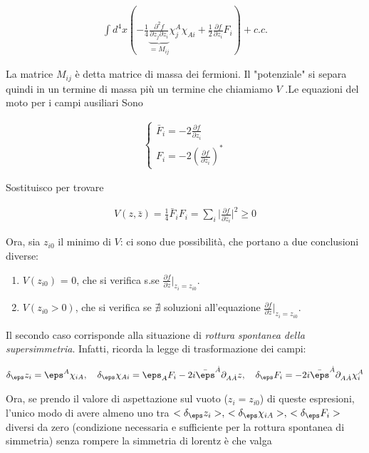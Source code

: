 \documentclass{report}
\begin{document}
\begin{align}
    \int d^4x \left(-\frac{1}{4}\underbrace{\frac{\partial^2 f}{\partial z_j \partial z_i}}_{= M_{ij}}\chi^A_j \chi_{Ai} + \frac{1}{2}\frac{\partial f}{\partial z_i}F_i \right) + c.c.
\end{align}

La matrice \(M_{ij}\) è detta matrice di massa dei fermioni. Il "potenziale" si separa quindi in un termine di massa più un termine che chiamiamo \(V\) .Le equazioni del moto per i campi ausiliari Sono

\begin{align}
    \begin{cases}
        \bar{F}_i = -2\frac{\partial f}{\partial z_i} \\ F_i = -2\left(\frac{\partial f}{\partial z_i}\right)^*
    \end{cases}
\end{align}

Sostituisco per trovare 

\begin{align}
    V(z, \bar{z}) = \frac{1}{4}\bar{F}_i F_i = \sum_i \biggr|\frac{\partial f}{\partial z_i} \biggr|^2 \geq 0 
\end{align}

Ora, sia \(z_{i0}\) il minimo di \(V\): ci sono due possibilità, che portano a due conclusioni diverse: 

\begin{enumerate}
    \item \(V(z_{i0})\) = 0, che si verifica s.se \(\frac{\partial f}{\partial z}\biggr|_{z_i = z_{i0}}\). 
    \item \(V(z_{i0} > 0)\), che si verifica se \(\nexists\) soluzioni all'equazione \(\frac{\partial f}{\partial z}\biggr|_{z_i = z_{i0}}\). 
\end{enumerate}

Il secondo caso corrisponde alla situazione di \emph{rottura spontanea della supersimmetria}. Infatti, ricorda la legge di trasformazione dei campi: 

\begin{align}
    \delta_\eps z_i = \eps^A \chi_{iA}, \quad \delta_\eps \chi_{Ai} = \eps_A F_i - 2i \bar{\eps}^{\dot{A}} \partial_{A\dot{A}}z, \quad \delta_\eps F_i = -2i \bar{\eps}^{\dot{A}}\partial_{A\dot{A}}\chi^A_i 
\end{align}

Ora, se prendo il valore di aspettazione sul vuoto (\(z_i = z_{i0}\)) di queste espresioni, l'unico modo di avere almeno uno tra \(<\delta_\eps z_i>, \, <\delta_\eps \chi_{iA}>, \, <\delta_\eps F_i> \) diversi da zero (condizione necessaria e sufficiente per la rottura spontanea di simmetria) senza rompere la simmetria di lorentz è che valga 
\end{document}
